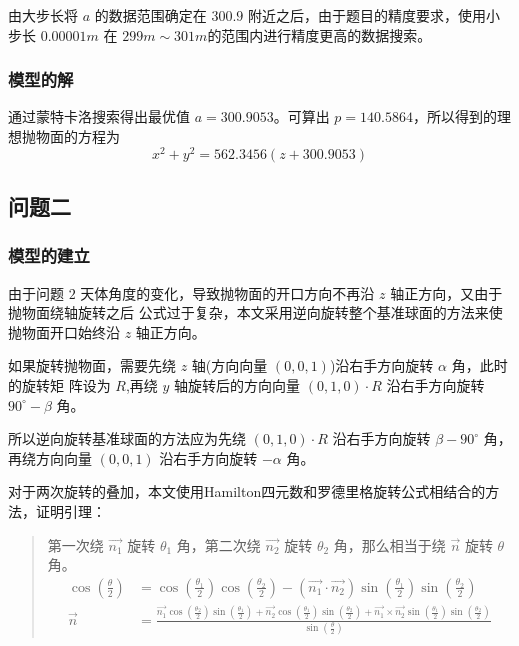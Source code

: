 \documentclass[withoutpreface,bwprint]{cumcmthesis} %
\begin{document}
由大步长将 $a$ 的数据范围确定在 $300.9$ 附近之后，由于题目的精度要求，使用小步长 $0.00001m$ 在
$299m \sim 301m$的范围内进行精度更高的数据搜索。
\subsubsection{模型的解}
通过蒙特卡洛搜索得出最优值 $a = 300.9053$。可算出 $p = 140.5864$，所以得到的理想抛物面的方程为
\[
    x^2 + y^2 = 562.3456(z + 300.9053)
\]
\subsection{问题二}
\subsubsection{模型的建立}
由于问题 $2$ 天体角度的变化，导致抛物面的开口方向不再沿 $z$ 轴正方向，又由于抛物面绕轴旋转之后
公式过于复杂，本文采用逆向旋转整个基准球面的方法来使抛物面开口始终沿 $z$ 轴正方向。

如果旋转抛物面，需要先绕 $z$ 轴(方向向量 $(0,0,1)$)沿右手方向旋转 $\alpha$ 角，此时的旋转矩
阵设为 $R$,再绕 $y$ 轴旋转后的方向向量 $(0,1,0)\cdot R$ 沿右手方向旋转 $90^\circ-\beta$
角。

所以逆向旋转基准球面的方法应为先绕 $(0,1,0)\cdot R$ 沿右手方向旋转 $\beta-90^\circ$ 角，
再绕方向向量 $(0,0,1)$ 沿右手方向旋转 $-\alpha$ 角。

对于两次旋转的叠加，本文使用Hamilton四元数和罗德里格旋转公式相结合的方法，证明引理：
\begin{quote}
    第一次绕 $\overrightarrow{n_1}$ 旋转 $\theta _1$ 角，第二次绕 $\overrightarrow{n_2}$
    旋转 $\theta _2$ 角，那么相当于绕 $\overrightarrow{n}$ 旋转 $\theta$ 角。
    \[
        \begin{split}
            \cos(\frac{\theta}{2}) &= \cos(\frac{\theta _1}{2})
            \cos(\frac{\theta _2}{2}) - (\overrightarrow{n_1} \cdot 
            \overrightarrow{n_2})\sin(\frac{\theta _1}{2})
            \sin(\frac{\theta _2}{2}) \\
            \overrightarrow{n} &= \frac{\displaystyle \overrightarrow{n_1}
            \cos(\frac{\theta _2}{2})\sin(\frac{\theta _1}{2}) + 
            \overrightarrow{n_2}\cos(\frac{\theta _1}{2})
            \sin(\frac{\theta _2}{2}) + \overrightarrow{n_1} \times 
            \overrightarrow{n_2}\sin(\frac{\theta _1}{2})
            \sin(\frac{\theta _2}{2})}
            {\displaystyle \sin(\frac{\theta}{2})} 
        \end{split}
    \]
\end{quote}
\end{document}
